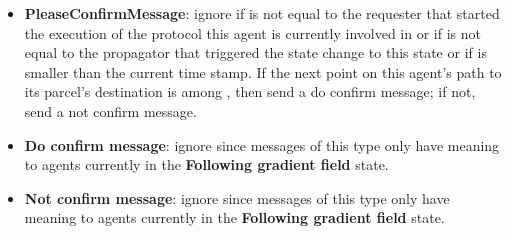 \begin{itemize}
    \item \textbf{PleaseConfirmMessage}: ignore if  is not equal to the requester that started the execution of the protocol this agent is currently involved in or if  is not equal to the propagator that triggered the state change to this state or if  is smaller than the current time stamp. If the next point on this agent's path to its parcel's destination is among , then send a do confirm message; if not, send a not confirm message.
    \item \textbf{Do confirm message}: ignore since messages of this type only have meaning to agents currently in the \textbf{Following gradient field} state.
    \item \textbf{Not confirm message}: ignore since messages of this type only have meaning to agents currently in the \textbf{Following gradient field} state.
\end{itemize}

